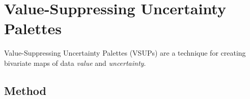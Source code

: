 \section{Value-Suppressing Uncertainty Palettes}

\flowFig

Value-Suppressing Uncertainty Palettes (VSUPs) are a technique for creating bivariate maps of data \emph{value} and \emph{uncertainty}.



\subsection{Method}

\flowFig

